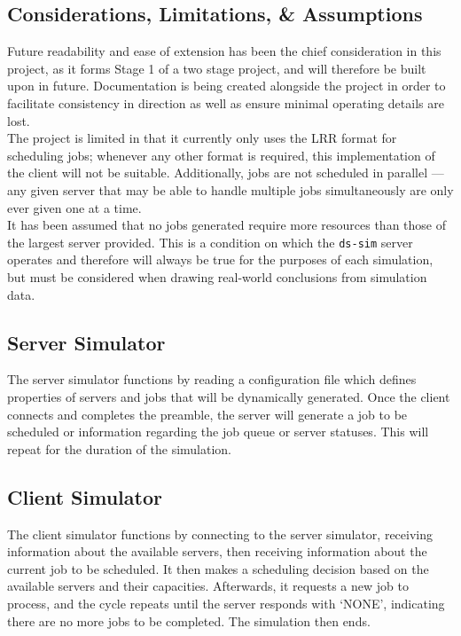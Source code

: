 \documentclass[a4paper]{article} %
\begin{document}
\subsection{Considerations, Limitations, \& Assumptions}
Future readability and ease of extension has been the chief consideration in this project, as it forms Stage 1 of a two stage project, and will therefore be built upon in future. Documentation is being created alongside 
the project in order to facilitate consistency in direction as well as ensure minimal operating details are lost.\\
The project is limited in that it currently only uses the LRR format for scheduling jobs; whenever any other format is required, this implementation of the client will not be suitable. Additionally, jobs are not scheduled 
in parallel --- any given server that may be able to handle multiple jobs simultaneously are only ever given one at a time.\\
It has been assumed that no jobs generated require more resources than those of the largest server provided. This is a condition on which the \texttt{ds-sim} server operates and therefore will always be true for the 
purposes of each simulation, but must be considered when drawing real-world conclusions from simulation data.
\subsection{Server Simulator}
The server simulator functions by reading a configuration file which defines properties of servers and jobs that will be dynamically generated. Once the client connects and completes the preamble, the server will generate 
a job to be scheduled or information regarding the job queue or server statuses. This will repeat for the duration of the simulation.
\subsection{Client Simulator}
The client simulator functions by connecting to the server simulator, receiving information about the available servers, then receiving information about the current job to be scheduled. It then makes a scheduling decision 
based on the available servers and their capacities. Afterwards, it requests a new job to process, and the cycle repeats until the server responds with `NONE', indicating there are no more jobs to be completed. The simulation 
then ends.
\end{document}
